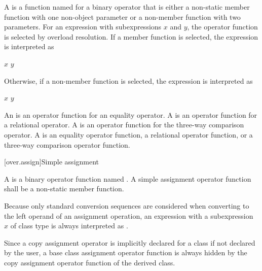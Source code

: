 \pnum
A 
is a function named 
for a binary operator  that is either
a non-static member function with one non-object parameter or
a non-member function with two parameters.
%
For an expression  with subexpressions $x$ and $y$,
the operator function is selected by overload resolution.
If a member function is selected,
the expression is interpreted as
\begin{ncsimplebnf}
$x$    \terminal{(} $y$ \terminal{)}
\end{ncsimplebnf}
Otherwise, if a non-member function is selected,
the expression is interpreted as
\begin{ncsimplebnf}
  \terminal{(} $x$ \terminal{,} $y$ \terminal{)}
\end{ncsimplebnf}

\pnum
An  is an operator function
for an equality operator.
A  is an operator function
for a relational operator.
A  is an operator function
for the three-way comparison operator.
A  is
an equality operator function,
a relational operator function, or
a three-way comparison operator function.

[over.assign]{Simple assignment}
%

\pnum
A 
is a binary operator function named .
A simple assignment operator function shall be a non-static member function.
\begin{note}
Because only standard conversion sequences are considered when converting
to the left operand of an assignment operation,
an expression  with a subexpression $x$ of class type
is always interpreted as .
\end{note}

\pnum
\begin{note}
Since a copy assignment operator is implicitly declared for a class
if not declared by the user,
a base class assignment operator function is always hidden by
the copy assignment operator function of the derived class.
\end{note}

